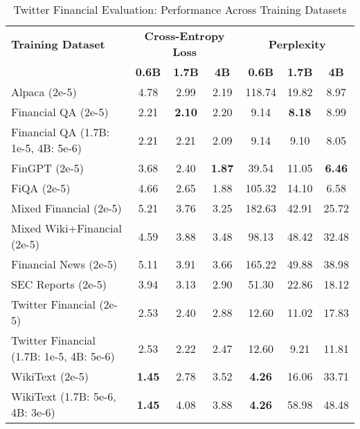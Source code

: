 
\begin{table}[htbp]
\centering
\caption[Twitter Financial Evaluation: Cross-Dataset Performance]{Twitter Financial Evaluation: Performance Across Training Datasets}
\label{tab:cross_twitter}
\begin{tabular}{l|ccc|ccc}
\hline
\textbf{Training Dataset} & \multicolumn{3}{c|}{\textbf{Cross-Entropy Loss}} & \multicolumn{3}{c}{\textbf{Perplexity}} \\
\cline{2-4} \cline{5-7}
  & \textbf{0.6B} & \textbf{1.7B} & \textbf{4B} & \textbf{0.6B} & \textbf{1.7B} & \textbf{4B} \\
Alpaca (2e-5) & 4.78 & 2.99 & 2.19 & 118.74 & 19.82 & 8.97  \\
Financial QA (2e-5) & 2.21 & \textbf{2.10} & 2.20 & 9.14 & \textbf{8.18} & 8.99  \\
Financial QA (1.7B: 1e-5, 4B: 5e-6) & 2.21 & 2.21 & 2.09 & 9.14 & 9.10 & 8.05  \\
FinGPT (2e-5) & 3.68 & 2.40 & \textbf{1.87} & 39.54 & 11.05 & \textbf{6.46}  \\
FiQA (2e-5) & 4.66 & 2.65 & 1.88 & 105.32 & 14.10 & 6.58  \\
Mixed Financial (2e-5) & 5.21 & 3.76 & 3.25 & 182.63 & 42.91 & 25.72  \\
Mixed Wiki+Financial (2e-5) & 4.59 & 3.88 & 3.48 & 98.13 & 48.42 & 32.48  \\
Financial News (2e-5) & 5.11 & 3.91 & 3.66 & 165.22 & 49.88 & 38.98  \\
SEC Reports (2e-5) & 3.94 & 3.13 & 2.90 & 51.30 & 22.86 & 18.12  \\
Twitter Financial (2e-5) & 2.53 & 2.40 & 2.88 & 12.60 & 11.02 & 17.83  \\
Twitter Financial (1.7B: 1e-5, 4B: 5e-6) & 2.53 & 2.22 & 2.47 & 12.60 & 9.21 & 11.81  \\
WikiText (2e-5) & \textbf{1.45} & 2.78 & 3.52 & \textbf{4.26} & 16.06 & 33.71  \\
WikiText (1.7B: 5e-6, 4B: 3e-6) & \textbf{1.45} & 4.08 & 3.88 & \textbf{4.26} & 58.98 & 48.48  \\
\hline
\end{tabular}
\end{table}

